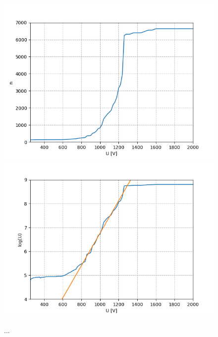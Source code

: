 \documentclass[12pt,a4paper]{article}
\begin{document}
\begin{figure}
\centering
\includegraphics[scale=0.8]{Bilder/Prop/Am_Puls_lin.PNG}
\includegraphics[scale=0.8]{Bilder/Prop/Am_Puls_exp.PNG}
\caption{...}
\label{fig:AMPulse}
\end{figure}
\end{document}
